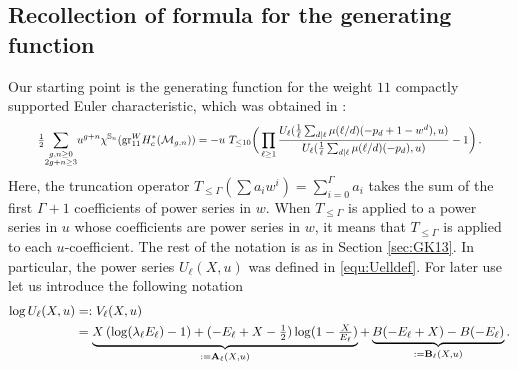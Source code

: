 \documentclass[12pt]{amsart}
\theoremstyle{definition}
\numberwithin{equation}{section}
\newcommand{\M}{\mathcal{M}}
\newcommand{\bA}{\mathbf{A}}
\newcommand{\bB}{\mathbf{B}}
\newcommand{\bbS}{\mathbb{S}}
\theoremstyle{definition} %
\theoremstyle{remark}
\newcommand{\gr}{\mathrm{gr}}
\begin{document}
\subsection{Recollection of formula for the generating function}
Our starting point is the generating function for the weight $11$ compactly supported Euler characteristic, which was obtained in \cite[Theorem 7.1]{PayneWillwacher24}:
\begin{equation}
\label{equ:ec11_withn}
\resizebox{.92\hsize}{!}{$
    \frac12 \displaystyle{\sum_{\substack{g,n\geq 0 \\ 2g+n\geq 3}}} u^{g+n} \chi^{\bbS_n}(\gr_{11}^W H^*_c(\M_{g,n}))
      =
      -u\  T_{\leq 10}\bigg(
      \prod_{\ell\geq 1} 
      \frac { 
        U_\ell(\frac 1 \ell \sum_{d\mid \ell} \mu(\ell/d) (-p_d  +1-w^d ), u )
      }
      { 
        U_\ell(\frac 1 \ell \sum_{d\mid \ell} \mu(\ell/d) (-p_d), u )
      }-1\bigg)\, .
      $}
\end{equation}
Here, the truncation operator $T_{\leq \Gamma}(\sum a_i w^i) = \sum_{i=0}^\Gamma a_i$ takes the sum of the first $\Gamma+1$ coefficients of power series in $w$.
When $T_{\leq \Gamma}$ is applied to a power series in $u$ whose coefficients are power series in $w$, it means that $T_{\leq \Gamma}$ is applied to each $u$-coefficient. The rest of the notation is as in Section \ref{sec:GK13}. In particular,
the power series $U_\ell(X, u)$ was defined in \eqref{equ:Uelldef}.
For later use let us introduce the following notation 
\begin{align}
    \log U_\ell(X,u)
&=:V_\ell(X,u) \notag  
 \\&=
        \underbrace{X\left(\log(\lambda_\ell E_\ell)-1 \right)+(-E_\ell+X-\textstyle{\frac 1 2} )\log(1-\textstyle{\frac X{E_\ell}})}_{:=\bA_\ell(X,u)} +
         \underbrace{B(-E_\ell+X)- B(-E_\ell)}_{:=\bB_\ell(X,u)}. \label{ABdefs}
\end{align}
\end{document}
